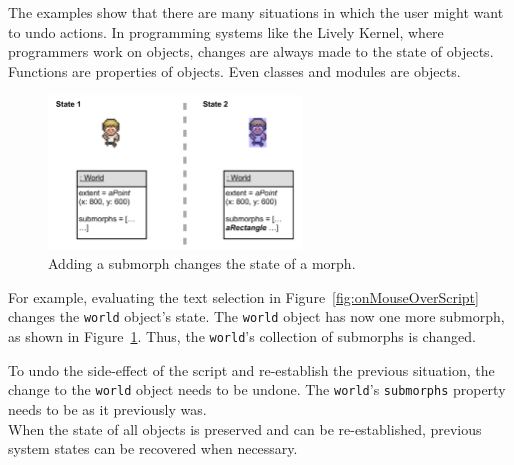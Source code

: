 The examples show that there are many situations in which the user might want to undo actions.
In programming systems like the Lively Kernel, where programmers work on objects, changes are always made to the state of objects.
Functions are properties of objects.
Even classes and modules are objects.

\begin{figure}[h]
    \centering
    \includegraphics[width=0.6\textwidth]{figures/3_motivation/5_stateChanges.pdf}
    \caption{Adding a submorph changes the state of a morph.}
    \label{fig:changedCharacter}
\end{figure}

For example, evaluating the text selection in Figure~\ref{fig:onMouseOverScript} changes the \lstinline{world} object's state.
The \lstinline{world} object has now one more submorph, as shown in Figure~\ref{fig:changedCharacter}.
Thus, the \lstinline{world}'s collection of submorphs is changed.

To undo the side-effect of the script and re-establish the previous situation, the change to the \lstinline{world} object needs to be undone.
The \lstinline{world}'s \lstinline{submorphs} property needs to be as it previously was.\\
When the state of all objects is preserved and can be re-established, previous system states can be recovered when necessary.
